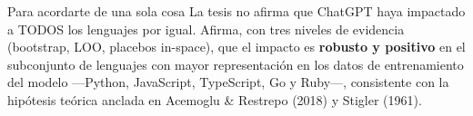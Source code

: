 \documentclass[11pt,a4paper]{article}
\begin{document}
\vspace{2\baselineskip}

\begin{ideabox}{Para acordarte de una sola cosa}
La tesis no afirma que ChatGPT haya impactado a TODOS los lenguajes por igual. Afirma, con tres niveles de evidencia (bootstrap, LOO, placebos in-space), que el impacto es \textbf{robusto y positivo} en el subconjunto de lenguajes con mayor representación en los datos de entrenamiento del modelo —Python, JavaScript, TypeScript, Go y Ruby—, consistente con la hipótesis teórica anclada en Acemoglu \& Restrepo (2018) y Stigler (1961).
\end{ideabox}
\end{document}
